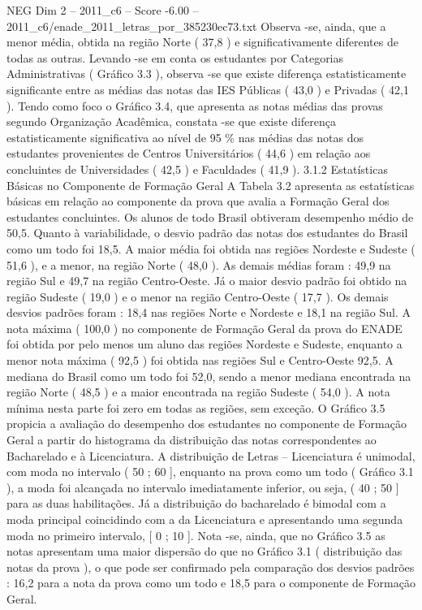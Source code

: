 \begin{textsample}{NEG Dim 2 – 2011\_c6 – Score -6.00 – 2011\_c6/enade\_2011\_letras\_por\_385230ec73.txt}
Observa -se, ainda, que a menor média, obtida na região Norte ( 37,8 ) e significativamente diferentes de todas as outras.
Levando -se em conta os estudantes por Categorias Administrativas ( Gráfico 3.3 ), observa -se que existe diferença estatisticamente significante entre as médias das notas das IES Públicas ( 43,0 ) e Privadas ( 42,1 ).
Tendo como foco o Gráfico 3.4, que apresenta as notas médias das provas segundo Organização Acadêmica, constata -se que existe diferença estatisticamente significativa ao nível de 95 \% nas médias das notas dos estudantes provenientes de Centros Universitários ( 44,6 ) em relação aos concluintes de Universidades ( 42,5 ) e Faculdades ( 41,9 ). 3.1.2 Estatísticas Básicas no Componente de Formação Geral A Tabela 3.2 apresenta as estatísticas básicas em relação ao componente da prova que avalia a Formação Geral dos estudantes concluintes.
Os alunos de todo Brasil obtiveram desempenho médio de 50,5.
Quanto à variabilidade, o desvio padrão das notas dos estudantes do Brasil como um todo foi 18,5.
A maior média foi obtida nas regiões Nordeste e Sudeste ( 51,6 ), e a menor, na região Norte ( 48,0 ).
As demais médias foram : 49,9 na região Sul e 49,7 na região Centro-Oeste.
Já o maior desvio padrão foi obtido na região Sudeste ( 19,0 ) e o menor na região Centro-Oeste ( 17,7 ).
Os demais desvios padrões foram : 18,4 nas regiões Norte e Nordeste e 18,1 na região Sul.
A nota máxima ( 100,0 ) no componente de Formação Geral da prova do ENADE foi obtida por pelo menos um aluno das regiões Nordeste e Sudeste, enquanto a menor nota máxima ( 92,5 ) foi obtida nas regiões Sul e Centro-Oeste 92,5.
A mediana do Brasil como um todo foi 52,0, sendo a menor mediana encontrada na região Norte ( 48,5 ) e a maior encontrada na região Sudeste ( 54,0 ).
A nota mínima nesta parte foi zero em todas as regiões, sem exceção.
O Gráfico 3.5 propicia a avaliação do desempenho dos estudantes no componente de Formação Geral a partir do histograma da distribuição das notas correspondentes ao Bacharelado e à Licenciatura.
A distribuição de Letras – Licenciatura é unimodal, com moda no intervalo ( 50 ; 60 ], enquanto na prova como um todo ( Gráfico 3.1 ), a moda foi alcançada no intervalo imediatamente inferior, ou seja, ( 40 ; 50 ] para as duas habilitações.
Já a distribuição do bacharelado é bimodal com a moda principal coincidindo com a da Licenciatura e apresentando uma segunda moda no primeiro intervalo, [ 0 ; 10 ].
Nota -se, ainda, que no Gráfico 3.5 as notas apresentam uma maior dispersão do que no Gráfico 3.1 ( distribuição das notas da prova ), o que pode ser confirmado pela comparação dos desvios padrões : 16,2 para a nota da prova como um todo e 18,5 para o componente de Formação Geral.

\end{textsample}
